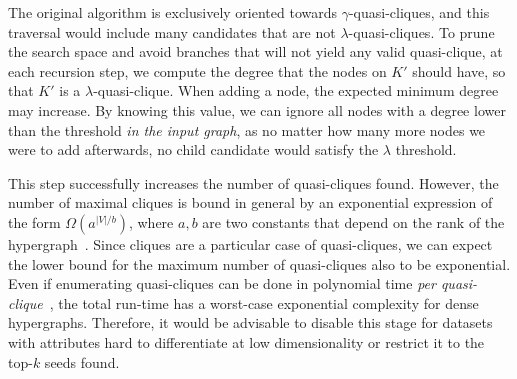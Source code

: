 The original algorithm \cite{uno_efficient_2010} is exclusively oriented towards
$\gamma$-quasi-cliques, and
this traversal would include many candidates that are not $\lambda$-quasi-cliques.
To prune the search space and avoid branches that will not yield any valid
quasi-clique, at each recursion step, we compute the degree that the nodes on
$K'$ should have, so that $K'$ is a $\lambda$-quasi-clique.
When adding a node, the expected minimum degree may increase.
By knowing this value, we can ignore all nodes with a degree lower than the threshold
\emph{in the input graph}, as no matter how many more nodes we were to add
afterwards, no child candidate would satisfy the $\lambda$ threshold.

This step successfully increases the number of quasi-cliques found.
However, the number of maximal cliques is bound in general by an exponential expression of the form
$\Omega(a^{|V|/b})$, where $a, b$ are two constants that depend on the rank of the hypergraph~\cite{Tomescu1981}.
Since cliques are a particular case of quasi-cliques, we can expect the lower bound for the
maximum number of quasi-cliques also to be exponential.
Even if enumerating quasi-cliques can be done in polynomial time
\emph{per quasi-clique}~\cite{uno_efficient_2010}, the total run-time has a worst-case exponential
complexity for dense hypergraphs. Therefore, it would be advisable to disable this stage for datasets
with attributes hard to differentiate at low dimensionality or restrict it to the top-$k$ 
seeds found.
\newpage


